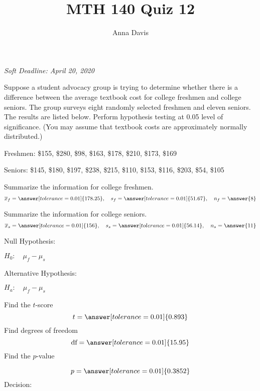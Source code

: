 \documentclass{ximera}
\author{Anna Davis} \title{MTH 140 Quiz 12}
\begin{document}
\begin{abstract}

\end{abstract}
\maketitle
 \textit{Soft Deadline: April 20, 2020}
\begin{problem}\label{prob:140quiz12prob1}
Suppose a student advocacy group is trying to determine whether there is a difference between the average textbook cost for college freshmen and college seniors.  The group surveys eight randomly selected freshmen and eleven seniors.  The results are listed below.  Perform hypothesis testing at 0.05 level of significance. (You may assume that textbook costs are approximately normally distributed.)

Freshmen: \$155, \$280, \$98, \$163, \$178, \$210, \$173, \$169

Seniors: \$145, \$180, \$197, \$238, \$215, \$110, \$153, \$116, \$203, \$54, \$105  

Summarize the information for college freshmen.
$$\overline{x}_f=\answer[tolerance=0.01]{178.25},\quad s_f=\answer[tolerance=0.01]{51.67},\quad n_f=\answer{8}$$

Summarize the information for college seniors.
$$\overline{x}_s=\answer[tolerance=0.01]{156},\quad s_s=\answer[tolerance=0.01]{56.14},\quad n_s=\answer{11}$$

Null Hypothesis:

$H_0:\quad \mu_f-\mu_s$ 

Alternative Hypothesis:

$H_a:\quad \mu_f-\mu_s$ 

Find the $t$-score
$$t=\answer[tolerance=0.01]{0.893}$$
Find degrees of freedom
$$\mbox{df}=\answer[tolerance=0.01]{15.95}$$
Find the $p$-value
\begin{center}  
\end{center}
$$p=\answer[tolerance=0.01]{0.3852}$$
Decision:

\begin{multipleChoice} 
\end{multipleChoice}  


\end{problem}
\end{document}
